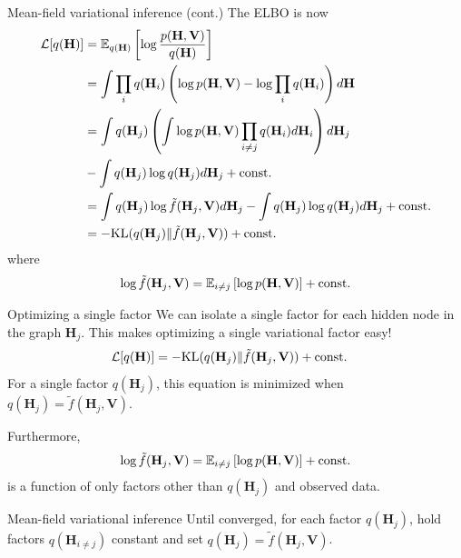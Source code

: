 \documentclass[10pt, compress]{beamer}
\begin{document}
\begin{frame}{Mean-field variational inference (cont.)}
  The ELBO is now
  \begin{align*}
    \mathcal{L}[q(\mathbf{H})] &= \mathbb{E}_{q(\mathbf{H})} \left[\log\frac{p(\mathbf{H}, \mathbf{V})}{q(\mathbf{H})}\right] \\
                      &= \int\prod_i q(\mathbf{H}_i) \left(\log p(\mathbf{H}, \mathbf{V}) - \log \prod_i q(\mathbf{H}_i)\right)d\mathbf{H}\\
                      &= \int q(\mathbf{H}_j) \left(\int \log p(\mathbf{H}, \mathbf{V})\prod_{i \neq j}q(\mathbf{H}_i)d\mathbf{H}_i \right)d\mathbf{H}_j \\&- \int q(\mathbf{H}_j)\log q(\mathbf{H}_j)d \mathbf{H}_j + \textrm{const.}\\
                      &= \int q(\mathbf{H}_j)\log \tilde{f}(\mathbf{H}_j, \mathbf{V})d \mathbf{H}_j- \int q(\mathbf{H}_j)\log q(\mathbf{H}_j)d \mathbf{H}_j  + \textrm{const.} \\
                      &= -\textrm{KL}(q(\mathbf{H}_j)\|\tilde{f}(\mathbf{H}_j, \mathbf{V}))  + \textrm{const.}
  \end{align*}
  where 
  \begin{align*}
    \log\tilde{f}(\mathbf{H}_j, \mathbf{V}) = \mathbb{E}_{i \neq j}\left[\log p(\mathbf{H}, \mathbf{V})\right] + \textrm{const.}
  \end{align*}

\end{frame}

\begin{frame}{Optimizing a single factor}
  We can isolate a single factor for each hidden node in the graph $\mathbf{H}_j$.
  This makes optimizing a single variational factor easy!
  \pause
  \begin{align*}
    \mathcal{L}[q(\mathbf{H})] &= -\textrm{KL}(q(\mathbf{H}_j)\|\tilde{f}(\mathbf{H}_j, \mathbf{V}))  + \textrm{const.}
  \end{align*}
  \pause
  For a single factor $q(\mathbf{H}_j)$, this equation is minimized
  when $q(\mathbf{H}_j) = \tilde{f}(\mathbf{H}_j, \mathbf{V})$.

  \pause
  Furthermore, 
  \begin{align*}
    \log\tilde{f}(\mathbf{H}_j, \mathbf{V}) = \mathbb{E}_{i \neq j}\left[\log p(\mathbf{H}, \mathbf{V})\right] + \textrm{const.}
  \end{align*}
  is a function of only factors other than $q(\mathbf{H}_j)$  and observed data.

  \pause
  \begin{block}{Mean-field variational inference}
    Until converged,
    for each factor $q(\mathbf{H}_j)$,
    hold factors $q(\mathbf{H}_{i \neq j})$ constant and
    set $q(\mathbf{H}_j) = \tilde{f}(\mathbf{H}_j, \mathbf{V})$.
  \end{block}
\end{frame}
\end{document}
